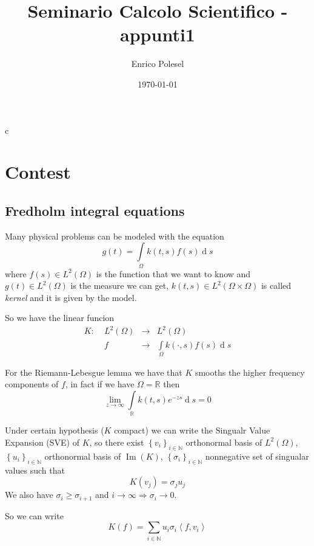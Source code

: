 c\documentclass[a4paper,10pt]{article}
\title{Seminario Calcolo Scientifico - appunti1}
\author{Enrico Polesel}
\date{\today}
\theoremstyle{plain}
\theoremstyle{definition}
\theoremstyle{remark}
\newcommand{\set}[1]{\left\{#1\right\}}
\newcommand{\ang}[1]{\left<#1\right>}
\newcommand{\intl}{\int \limits}
\DeclareMathOperator{\de}{d}
\DeclareMathOperator{\im}{Im}
\begin{document}
\maketitle

\section{Contest}
\label{sec:contest}

\subsection{Fredholm integral equations}
\label{sec:fredholm}

Many physical problems can be modeled with the equation
\begin{equation}
  \label{eq:fredholm}
  g(t) = \intl _{\Omega} k(t,s) f(s) \de s
\end{equation}
where $f(s)\in L^2(\Omega)$ is the function that we want to know and
$g(t)\in L^2(\Omega)$ is the measure we can get, $k(t,s) \in
L^2(\Omega \times \Omega)$ is called \textit{kernel} and it is given
by the model.

So we have the linear funcion
\[ \begin{matrix}
  K:\; &L^2(\Omega) &\longrightarrow &L^2(\Omega)\\
  & f &\longrightarrow & \intl _\Omega k(\cdot , s) f(s) \de s
  \end{matrix}
\]

For the Riemann-Lebesgue lemma we have that $K$ smooths the higher
frequency components of $f$, in fact if we have $\Omega = \mathbb{R}$
then
\[ \lim _{z \to \infty} \intl _\mathbb{R} k(t,s) e^{-zs} \de s = 0 \]

Under certain hypothesis ($K$ compact) we can write the Singualr Value
Expansion (SVE) of $K$, so there exist $\set{v_i}_{i\in \mathbb{N}}$
orthonormal basis of $L^2(\Omega)$, $\set{u_i}_{i\in \mathbb{N}}$
orthonormal basis of $\im(K)$, $\set{\sigma _i}_{i\in \mathbb{N}}$
nonnegative set of singualar values such that
\begin{equation}
  \label{eq:SVErealtion}
  K(v_j) = \sigma _j u_j
\end{equation}
We also have $\sigma _i \ge \sigma _{i+1}$ and $i \to \infty \Rightarrow
\sigma _i \to 0$.

So we can write
\begin{equation}
  \label{eq:SVE}
  K(f) = \sum _{i\in \mathbb{N}} u_i \sigma _i \ang{f,v_i}
\end{equation}
\end{document}
